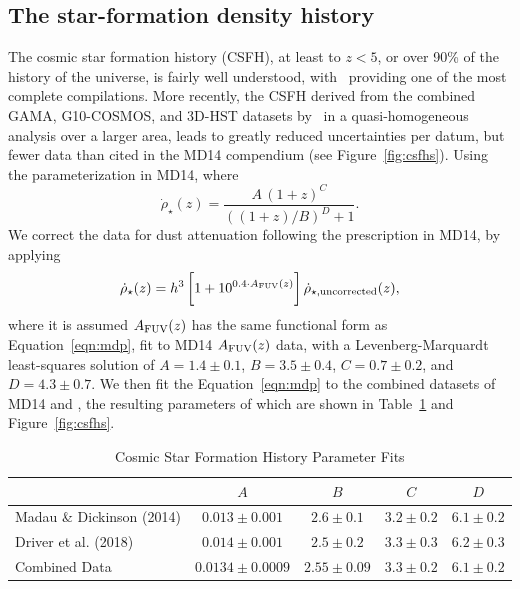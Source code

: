 \documentclass[apj]{aastex}
\begin{document}
\subsection{The star-formation density history}
The cosmic star formation history (CSFH), at least to $z < 5$, or over 90\% of the history of the universe, is fairly well understood, with~\cite[][MD14 hereafter]{Madau:2014fk} providing one of the most complete compilations. More recently, the CSFH derived from the combined GAMA, G10-COSMOS, and 3D-HST datasets by~\cite{Driver:2018nr} in a quasi-homogeneous analysis over a larger area, leads to greatly reduced uncertainties per datum, but fewer data than cited in the MD14 compendium (see Figure~\ref{fig:csfhs}).  Using the parameterization in MD14, where
\begin{equation}
\dot{\rho}_{\star}(z) = \frac{A\,(1+z)^C}{((1+z)/B)^D+1}.\label{eqn:mdp}
\end{equation}
We correct the \cite{Driver:2018nr} data for dust attenuation following the prescription in MD14, by applying 
\begin{equation}
	\dot{\rho}_{\star}(z) =h^3\,\biggl[1+10^{0.4\cdot A_{\rm FUV}(z)}\biggr]\, \dot{\rho}_{\star, {\rm uncorrected}}(z),
\end{equation}
where it is assumed $A_{\rm FUV}(z)$ has the same functional form as Equation~\ref{eqn:mdp}, fit to MD14 $A_{\rm FUV}(z)$ data, with a Levenberg-Marquardt least-squares solution of $A=1.4\pm0.1$, $B=3.5\pm0.4$, $C=0.7\pm0.2$, and $D=4.3\pm0.7$. We then fit the Equation~\ref{eqn:mdp} to the combined datasets of MD14 and \cite{Driver:2018nr}, the resulting parameters of which are shown in Table~\ref{tab:csfh_fits} and Figure~\ref{fig:csfhs}. 

\begin{table}
    \centering
    \caption{Cosmic Star Formation History Parameter Fits}
    \label{tab:csfh_fits}
    \begin{tabular}{lcccc}
         & $A$ & $B$ & $C$ & $D$ \\
        \hline
	Madau \& Dickinson (2014) & $0.013 \pm 0.001$ & $2.6 \pm 0.1$ & $3.2 \pm 0.2$ & $6.1 \pm 0.2$\\
	Driver et al. (2018) & $0.014 \pm 0.001$ & $2.5 \pm 0.2$ & $3.3 \pm 0.3$ & $6.2 \pm 0.3$\\
	\hline
	\hline
	Combined  Data & $0.0134 \pm 0.0009$ & $2.55 \pm 0.09$ & $3.3 \pm 0.2$ & $6.1 \pm 0.2$\\

    \end{tabular}
\end{table}
\end{document}
